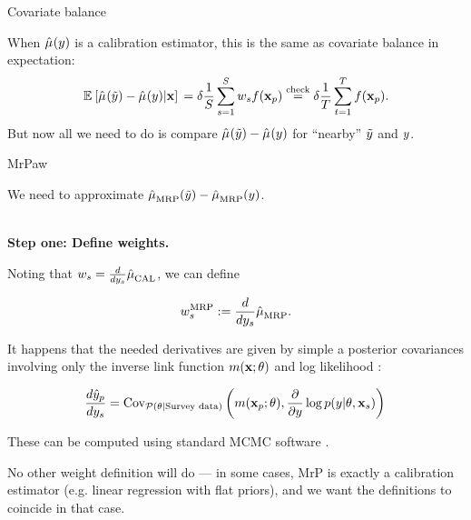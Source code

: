 
\begin{frame}[t]{Covariate balance}



When $\hat{\mu}^{}(y)$ is a calibration estimator, this is the same as covariate balance
in expectation:
$$
\begin{aligned}
    \mathbb{E}_{}\left[ \hat{\mu}^{}(\tilde{y}) - \hat{\mu}^{}(y) | \mathbf{x}\right]\, =
    \delta \frac{1}{S} \sum_{s=1}^S w_s f(\mathbf{x}_p) \overset{\textrm{check}}{=}
        \delta \frac{1}{T} \sum_{t=1}^T f(\mathbf{x}_p).
\end{aligned}
$$
%
But now all we need to do is compare $\hat{\mu}^{}(\tilde{y}) - \hat{\mu}^{}(y)$ for
``nearby'' $\tilde{y}$ and $y$.



\end{frame}







\begin{frame}[t]{MrPaw}

We need to approximate $\hat{\mu}^{}_{\mathrm{MRP}}(\tilde{y}) - \hat{\mu}^{}_{\mathrm{MRP}}(y)$.

\vspace{1em}
\hrulefill\\
\textbf{Step one: Define weights.}

Noting that $w_s = \frac{d}{d y_s} \hat{\mu}^{}_{\mathrm{CAL}}$, we can define

$$
\wmrp_s := \frac{d}{d\y_s} \muhat_{\mrp}. %
$$

It happens that the needed derivatives are given
by simple a posterior covariances involving only the inverse
link function $m(\mathbf{x}; \theta)$ and
log likelihood \citep{giordano:2018:covariances}:

$$
\frac{d \hat{y}_p}{dy_s}  =
    \mathrm{Cov}_{\mathcal{P}(\theta \vert \textrm{Survey data})}\left( 
        m(\mathbf{x}_p; \theta),
        \frac{\partial}{\partial y} \log p(y \vert \theta, \mathbf{x}_s)\right)\,
$$

These can be computed using standard MCMC software \citep{brms}.

No other weight definition will do --- in some cases,
MrP is exactly a calibration estimator (e.g. linear regression with flat priors),
and we want the definitions to coincide in that case.

\end{frame}



